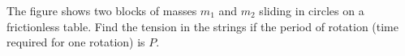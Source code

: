  The figure shows two blocks of masses $m_1$ and $m_2$
sliding in circles on a frictionless table. Find the tension
in the strings if the period of rotation (time required for
one rotation) is $P$.\answercheck
